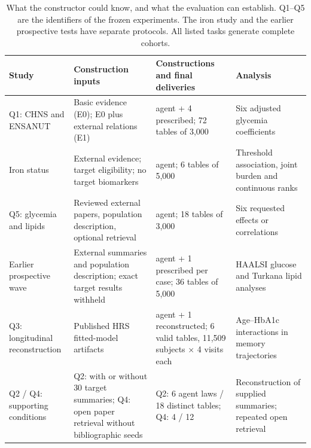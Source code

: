 \documentclass[sigconf,review]{acmart}
\begin{document}
\begin{table}[tp]

\caption{What the constructor could know, and what the evaluation can establish. Q1–\allowbreak{}Q5 are the identifiers of the frozen experiments. The iron study and the earlier prospective tests have separate protocols. All listed tasks generate complete cohorts.}

\label{tab:1}

\centering\small

\renewcommand{\arraystretch}{1.12}

\begin{tabularx}{\textwidth}{@{}>{\raggedright\arraybackslash}X>{\raggedright\arraybackslash}X>{\raggedright\arraybackslash}X>{\raggedright\arraybackslash}X@{}}

\toprule

Study & Construction inputs & Constructions and final deliveries & Analysis \\

\midrule

Q1: CHNS and ENSANUT & Basic evidence (E0); E0 plus external relations (E1) & 20 agent + 4 prescribed; 72 tables of 3,000 & Six adjusted glycemia coefficients \\

Iron status & External evidence; target eligibility; no target biomarkers & 2 agent; 6 tables of 5,000 & Threshold association, joint burden and continuous ranks \\

Q5: glycemia and lipids & Reviewed external papers, population description, optional retrieval & 6 agent; 18 tables of 3,000 & Six requested effects or correlations \\

Earlier prospective wave & External summaries and population description; exact target results withheld & 5 agent + 1 prescribed per case; 36 tables of 5,000 & HAALSI glucose and Turkana lipid analyses \\

Q3: longitudinal reconstruction & Published HRS fitted-model artifacts & 1 agent + 1 reconstructed; 6 valid tables, 11,509 subjects × 4 visits each & Age–\allowbreak{}HbA1c interactions in memory trajectories \\

Q2 / Q4: supporting conditions & Q2: with or without 30 target summaries; Q4: open paper retrieval without bibliographic seeds & Q2: 6 agent laws / 18 distinct tables; Q4: 4 / 12 & Reconstruction of supplied summaries; repeated open retrieval \\

\bottomrule

\end{tabularx}

\end{table}
\end{document}
